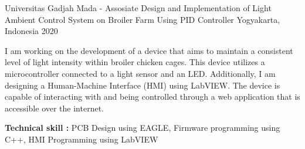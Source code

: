 \begin{cventries}
\cventry
{Universitas Gadjah Mada - Assosiate} %
{Design and Implementation of Light Ambient Control System on Broiler Farm Using PID Controller} %
{Yogyakarta, Indonesia} %
{2020} %
{
  \begin{cvitems} %
    \item{I am working on the development of a device that aims to maintain a consistent level of light intensity within broiler chicken cages. This device utilizes a microcontroller connected to a light sensor and an LED. Additionally, I am designing a Human-Machine Interface (HMI) using LabVIEW. The device is capable of interacting with and being controlled through a web application that is accessible over the internet.}
    \item{\textbf{Technical skill : } PCB Design using EAGLE, Firmware programming using C++, HMI Programming using LabVIEW}
  \end{cvitems}
}



\end{cventries}

